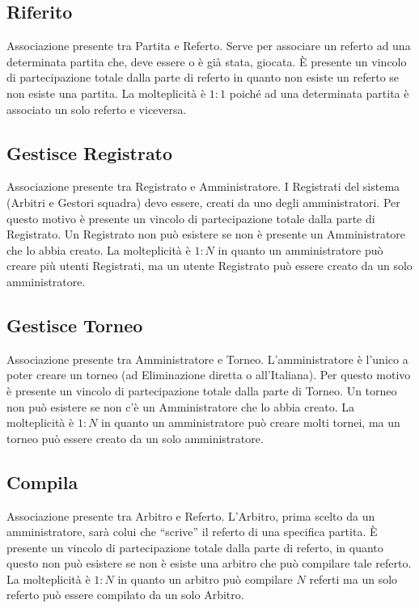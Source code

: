 	\subsection{Riferito}
	Associazione presente tra Partita e Referto.
	Serve per associare un referto ad una determinata partita che, deve essere o è già stata, giocata.
	È presente un vincolo di partecipazione totale dalla parte di referto in quanto non esiste un referto se non esiste una partita. 
	La molteplicità è $1:1$ poiché ad una determinata partita è associato un solo referto e viceversa.
	
	\subsection{Gestisce Registrato}
	Associazione presente tra Registrato e Amministratore.
	I Registrati del sistema (Arbitri e Gestori squadra) devo essere, creati da uno degli amministratori. Per questo motivo è presente un vincolo di partecipazione totale dalla parte di Registrato. Un Registrato non può esistere se non è presente un Amministratore che lo abbia creato.
	La molteplicità è $1:N$ in quanto un amministratore può creare più utenti Registrati, ma un utente Registrato può essere creato da un solo amministratore.
	
	\subsection{Gestisce Torneo}
	Associazione presente tra Amministratore e Torneo.
	L’amministratore è l’unico a poter creare un torneo (ad Eliminazione diretta o all’Italiana). Per questo motivo è presente un vincolo di partecipazione totale dalla parte di Torneo. Un torneo non può esistere se non c’è un Amministratore che lo abbia creato.
	La molteplicità è $1:N$ in quanto un amministratore può creare molti tornei, ma un torneo può essere creato da un solo amministratore.
	
	\subsection{Compila}
	Associazione presente tra Arbitro e Referto.
	L'Arbitro, prima scelto da un amministratore, sarà colui che ``scrive'' il referto di una specifica partita.
	È presente un vincolo di partecipazione totale dalla parte di referto, in quanto questo non può esistere se non è esiste una arbitro che può compilare tale referto.
	La molteplicità è $1:N$ in quanto un arbitro può compilare $N$ referti ma un solo referto può essere compilato da un solo Arbitro.
	
